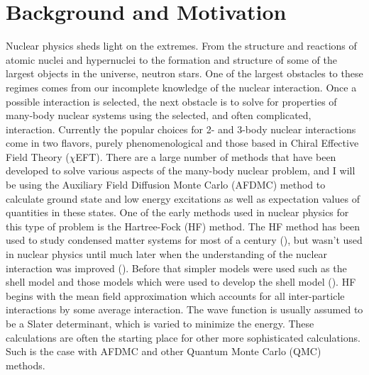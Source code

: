 \chapter{Background and Motivation}
Nuclear physics sheds light on the extremes. From the structure and reactions of atomic nuclei and hypernuclei to the formation and structure of some of the largest objects in the universe, neutron stars. One of the largest obstacles to these regimes comes from our incomplete knowledge of the nuclear interaction. Once a possible interaction is selected, the next obstacle is to solve for properties of many-body nuclear systems using the selected, and often complicated, interaction. Currently the popular choices for 2- and 3-body nuclear interactions come in two flavors, purely phenomenological and those based in Chiral Effective Field Theory ($\chi$EFT). There are a large number of methods that have been developed to solve various aspects of the many-body nuclear problem, and I will be using the Auxiliary Field Diffusion Monte Carlo (AFDMC) method to calculate ground state and low energy excitations as well as expectation values of quantities in these states. One of the early methods used in nuclear physics for this type of problem is the Hartree-Fock (HF) method. The HF method has been used to study condensed matter systems for most of a century (\cite{hartree1928, fock1930, slater1951}), but wasn't used in nuclear physics until much later when the understanding of the nuclear interaction was improved (\cite{zofka1970, gogny1986}). Before that simpler models were used such as the shell model and those models which were used to develop the shell model (\cite{mayer1950_1,mayer1950_2}). HF begins with the mean field approximation which accounts for all inter-particle interactions by some average interaction. The wave function is usually assumed to be a Slater determinant, which is varied to minimize the energy. These calculations are often the starting place for other more sophisticated calculations. Such is the case with AFDMC and other Quantum Monte Carlo (QMC) methods.


